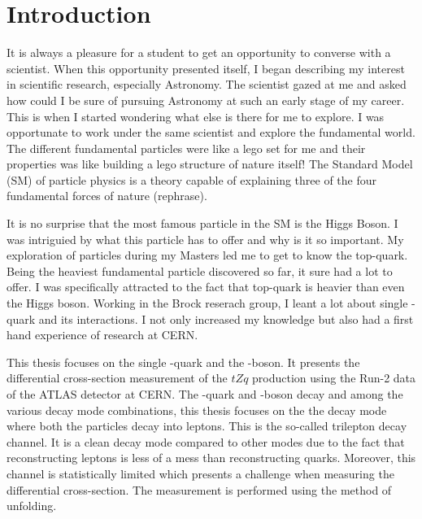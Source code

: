 
\chapter{Introduction}
\label{sec:intro}

It is always a pleasure for a student to get an opportunity to converse with a scientist. When this opportunity presented itself, I began describing my 
interest in scientific research, especially Astronomy. The scientist gazed at me and asked how could I be sure of pursuing Astronomy at such an early
stage of my career. This is when I started wondering what else is there for me to explore. I was opportunate to work under the same scientist and explore the
fundamental world. The different fundamental particles were like a lego set for me and their properties was like building a lego structure of nature itself!
The Standard Model (SM) of particle physics is a theory capable of explaining three of the four fundamental forces of nature (rephrase). 

It is no surprise that the most famous particle in the SM is the Higgs Boson. I was intriguied by what this particle has to offer and why is it so important.
My exploration of particles during my Masters led me to get to know the top-quark. Being the heaviest fundamental particle discovered so far, it sure had a lot 
to offer. I was specifically attracted to the fact that top-quark is heavier than even the Higgs boson. Working in the Brock reserach group, I leant a lot about
single \Ptop-quark and its interactions. I not only increased my knowledge but also had a first hand experience of research at CERN. 

This thesis focuses on the single \Ptop-quark and the \PZ-boson. It presents the differential cross-section measurement of the $tZq$ production using 
the Run-2 data of the ATLAS detector at CERN. The \Ptop-quark and \PZ-boson decay and among the various decay mode combinations, this thesis focuses on the 
the decay mode where both the particles decay into leptons. This is the so-called trilepton decay channel. It is a clean decay mode compared to other modes
due to the fact that reconstructing leptons is less of a mess than reconstructing quarks. Moreover, this channel is statistically limited which presents a 
challenge when measuring the differential cross-section. The measurement is performed using the method of unfolding. 

